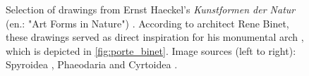 \documentclass{article}
\begin{document}
\begin{figure}[ht!]
    \centering
    \caption{Selection of drawings from Ernst Haeckel's \textit{Kunstformen der Natur} (en.: "Art Forms in Nature") \cite{haeckel_kunstformen_2012}. According to architect Rene Binet, these drawings served as direct inspiration for his monumental arch \cite[Sec. "Haeckel und der Jugendstil"]{willmann_haeckel_2019}, which is depicted in \cref{fig:porte_binet}. \newline Image sources (left to right): Spyroidea \cite{haeckel_kunstformen_1904}, Phaeodaria \cite{haeckel_kunstformen_1904} and Cyrtoidea \cite{haeckel_kunstformen_1904-2}.}
    \label{fig:kunstformen}
\end{figure}
\end{document}
